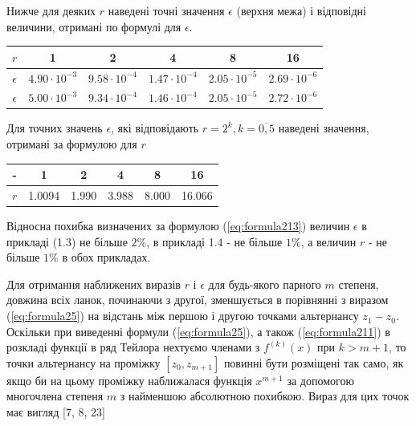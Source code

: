 \documentclass[ukrainian,14pt]{extarticle}
\begin{document}
    Нижче для деяких $r$ наведені точні значення $\epsilon$ (верхня межа) і відповідні величини, отримані по формулі для $\epsilon$.
    
\bgroup
\def\arraystretch{1.5}
\begin{center}
\begin{tabular}{ c | c |
c | c | c | c}
 $r$ & 1 & 2 & 4 & 8 & 16 \\
 \hline
 $\epsilon$ & $4.90 \cdot 10^{-3}$ & $9.58 \cdot 10^{-4}$ & $1.47 \cdot 10^{-4}$ & $2.05 \cdot 10^{-5}$ & $2.69 \cdot 10^{-6}$ \\  
 \hline
 $\epsilon$ & $5.00 \cdot 10^{-3}$ & $9.34 \cdot 10^{-4}$ & $1.46 \cdot 10^{-4}$ & $2.05 \cdot 10^{-5}$ & $2.72 \cdot 10^{-6}$ \\  

\end{tabular}
\end{center}
\egroup

Для точних значень $\epsilon$, які відповідають $r = 2^k, k = \overline{0, 5}$ наведені значення, отримані за формулою для $r$

\bgroup
\def\arraystretch{1.5}
\begin{center}
\begin{tabular}{ c | c |
c | c | c | c}
 - & 1 & 2 & 4 & 8 & 16 \\
 \hline
 $r$ & 1.0094 & 1.990 & 3.988 & 8.000 & 16.066 \\  

\end{tabular}
\end{center}
\egroup

Відносна похибка визначених за формулою (\ref{eq:formula213}) величин $\epsilon$ в прикладі (1.3) не більше $2\%$, в прикладі 1.4 - не більше $1\%$, а величин $r$ - не більше $1\%$ в обох прикладах.

Для отримання наближених виразів $r$ і $\epsilon$ для будь-якого парного $m$ степеня, довжина всіх ланок, починаючи з другої, зменшується в порівнянні з виразом (\ref{eq:formula25}) на відстань між першою і другою точками альтернансу $z_1 - z_0$. Оскільки при виведенні формули (\ref{eq:formula25}), а також (\ref{eq:formula211}) в розкладі функції в ряд Тейлора нехтуємо членами з $f^{(k)}(x)$ при $k > m + 1$, то точки альтернансу на проміжку $[z_0, z_{m+1}]$ повинні бути розміщені так само, як якщо би на цьому проміжку наближалася функція $x^{m+1}$ за допомогою многочлена степеня $m$ з найменшою абсолютною похибкою. Вираз для цих точок має вигляд [7, 8, 23]
\end{document}
